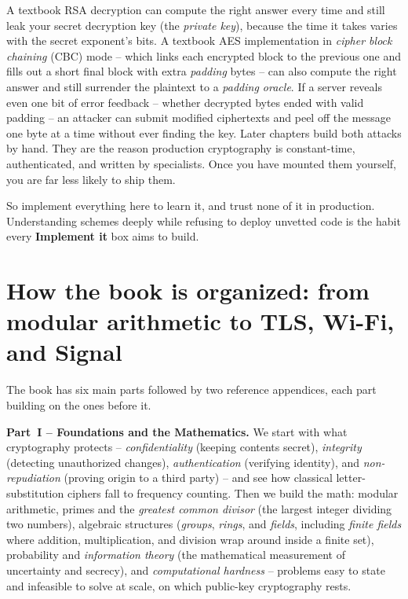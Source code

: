\begin{attackbox}
A textbook RSA decryption can compute the right answer every time and still leak your secret decryption key (the \emph{private key}), because the time it takes varies with the secret exponent's bits. A textbook AES implementation in \emph{cipher block chaining} (CBC) mode -- which links each encrypted block to the previous one and fills out a short final block with extra \emph{padding} bytes -- can also compute the right answer and still surrender the plaintext to a \emph{padding oracle}. If a server reveals even one bit of error feedback -- whether decrypted bytes ended with valid padding -- an attacker can submit modified ciphertexts and peel off the message one byte at a time without ever finding the key. Later chapters build both attacks by hand. They are the reason production cryptography is constant-time, authenticated, and written by specialists. Once you have mounted them yourself, you are far less likely to ship them.
\end{attackbox}

So implement everything here to learn it, and trust none of it in production. Understanding schemes deeply while refusing to deploy unvetted code is the habit every \textbf{Implement it} box aims to build.

\section*{How the book is organized: from modular arithmetic to TLS, Wi-Fi, and Signal}

The book has six main parts followed by two reference appendices, each part building on the ones before it.

\textbf{Part~I -- Foundations and the Mathematics.} We start with what cryptography protects -- \emph{confidentiality} (keeping contents secret), \emph{integrity} (detecting unauthorized changes), \emph{authentication} (verifying identity), and \emph{non-repudiation} (proving origin to a third party) -- and see how classical letter-substitution ciphers fall to frequency counting. Then we build the math: modular arithmetic, primes and the \emph{greatest common divisor} (the largest integer dividing two numbers), algebraic structures (\emph{groups}, \emph{rings}, and \emph{fields}, including \emph{finite fields} where addition, multiplication, and division wrap around inside a finite set), probability and \emph{information theory} (the mathematical measurement of uncertainty and secrecy), and \emph{computational hardness} -- problems easy to state and infeasible to solve at scale, on which public-key cryptography rests.

